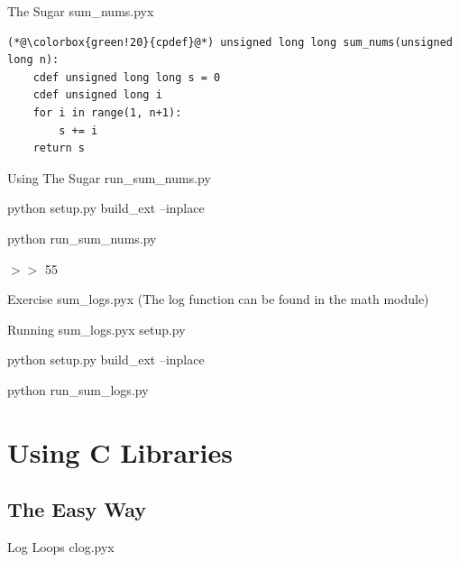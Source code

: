 \documentclass[11pt]{beamer}
\begin{document}
\begin{frame}[fragile]{The Sugar}
    sum\_nums.pyx
    \begin{lstlisting}
(*@\colorbox{green!20}{cpdef}@*) unsigned long long sum_nums(unsigned long n):
    cdef unsigned long long s = 0
    cdef unsigned long i
    for i in range(1, n+1):
        s += i
    return s
    \end{lstlisting}
\end{frame}

\begin{frame}[fragile]{Using The Sugar}
    run\_sum\_nums.py
    

	\vspace{1cm}

    \pause
    python setup.py build\_ext --inplace

    python run\_sum\_nums.py

    \pause
    $>>$ 55

\end{frame}

\begin{frame}[fragile]{Exercise}
    sum\_logs.pyx (The log function can be found in the math module)
    \pause
    
\end{frame}

\begin{frame}[fragile]{Running sum\_logs.pyx}
	setup.py
	
	
	\pause
	python setup.py build\_ext --inplace

	python run\_sum\_logs.py
\end{frame}

\section{Using C Libraries}
\subsection{The Easy Way}
\begin{frame}[fragile]{Log Loops}
    clog.pyx
    
\end{frame}
\end{document}
